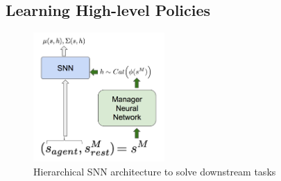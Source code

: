 \documentclass{article} %
\begin{document}

\subsection{Learning High-level Policies}
\label{section:method:highlevel}

\begin{figure}
\vspace{-40pt}
\includegraphics[width = 5cm]{Figures/hierarchical-SNN.png}
\caption{Hierarchical SNN architecture to solve downstream tasks}
\label{fig:hierarchical_snn_architecture}
\end{figure}
\end{document}
